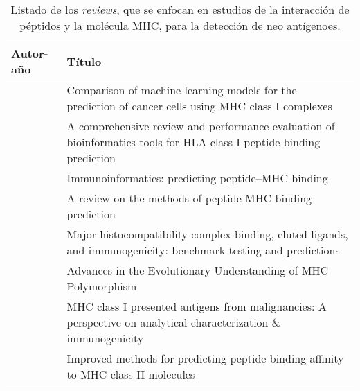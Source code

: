 \begin{table}[H]
	\caption{Listado de los \textit{reviews}, que se enfocan en estudios de la interacción de péptidos y la molécula MHC, para la detección de neo antígenoes.}
	\label{tab:review_mhc}
	\begin{tabular}{p{3cm}p{10cm}}
		\textbf{Autor-año }                            & \textbf{Título}                                                                                                                                \\ \hline
		\cite{mateo2020comparison}          & Comparison of machine learning models for the prediction of cancer cells using MHC class I complexes                 \\
		\cite{mei2020comprehensive}         & A comprehensive review and performance evaluation of bioinformatics tools for HLA class I peptide-binding prediction \\
		
		\cite{nielsen2020immunoinformatics} & Immunoinformatics: predicting peptide–MHC binding                                                                    \\
		\cite{liu2020review}                & A review on the methods of peptide-MHC binding prediction                                                            \\
		\cite{paul2020major}                & Major histocompatibility complex binding, eluted ligands, and immunogenicity: benchmark testing and predictions      \\
	
		\cite{radwan2020advances}           & Advances in the Evolutionary Understanding of MHC Polymorphism 
		
		                                                      \\
		
		\cite{schmidt2019mhc}               & MHC class I presented antigens from malignancies: A perspective on analytical characterization \& immunogenicity     \\
	
		\cite{jensen2018improved}           & Improved methods for predicting peptide binding affinity to MHC class II molecules                                   \\
		

\end{tabular}
\end{table}
